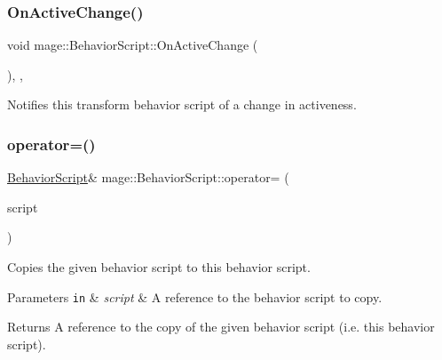 \subsubsection{\texorpdfstring{On\+Active\+Change()}{OnActiveChange()}}
{\footnotesize\ttfamily void mage\+::\+Behavior\+Script\+::\+On\+Active\+Change (\begin{DoxyParamCaption}{ }\end{DoxyParamCaption})\hspace{0.3cm}{\ttfamily [private]}, {\ttfamily [virtual]}, {\ttfamily [noexcept]}}

Notifies this transform behavior script of a change in activeness. \hypertarget{classmage_1_1_behavior_script_a0b3327ebf7009e668a7022d254cb1d51}{}\label{classmage_1_1_behavior_script_a0b3327ebf7009e668a7022d254cb1d51} 
\subsubsection{\texorpdfstring{operator=()}{operator=()}\hspace{0.1cm}{\footnotesize\ttfamily [1/2]}}
{\footnotesize\ttfamily \hyperlink{classmage_1_1_behavior_script}{Behavior\+Script}\& mage\+::\+Behavior\+Script\+::operator= (\begin{DoxyParamCaption}\item[{const \hyperlink{classmage_1_1_behavior_script}{Behavior\+Script} \&}]{script }\end{DoxyParamCaption})\hspace{0.3cm}{\ttfamily [delete]}}

Copies the given behavior script to this behavior script.


\begin{DoxyParams}[1]{Parameters}
\mbox{\tt in}  & {\em script} & A reference to the behavior script to copy. \\
\hline
\end{DoxyParams}
\begin{DoxyReturn}{Returns}
A reference to the copy of the given behavior script (i.\+e. this behavior script). 
\end{DoxyReturn}
\hypertarget{classmage_1_1_behavior_script_a528c2bd218f2e6bb7d0a8ee50a05bf01}{}\label{classmage_1_1_behavior_script_a528c2bd218f2e6bb7d0a8ee50a05bf01} 
